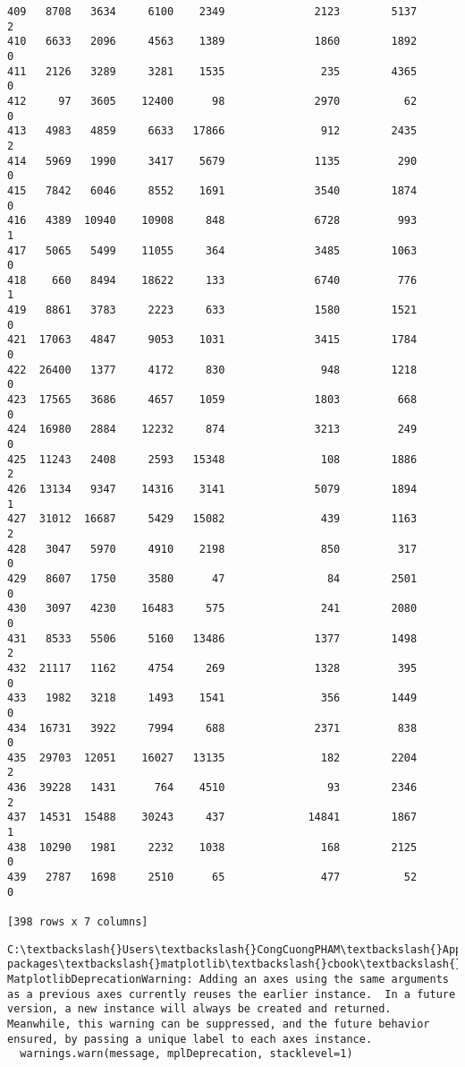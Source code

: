 \documentclass[11pt]{article}
\begin{document}
\begin{Verbatim}[commandchars=\\\{\}]
409   8708   3634     6100    2349              2123        5137      2
410   6633   2096     4563    1389              1860        1892      0
411   2126   3289     3281    1535               235        4365      0
412     97   3605    12400      98              2970          62      0
413   4983   4859     6633   17866               912        2435      2
414   5969   1990     3417    5679              1135         290      0
415   7842   6046     8552    1691              3540        1874      0
416   4389  10940    10908     848              6728         993      1
417   5065   5499    11055     364              3485        1063      0
418    660   8494    18622     133              6740         776      1
419   8861   3783     2223     633              1580        1521      0
421  17063   4847     9053    1031              3415        1784      0
422  26400   1377     4172     830               948        1218      0
423  17565   3686     4657    1059              1803         668      0
424  16980   2884    12232     874              3213         249      0
425  11243   2408     2593   15348               108        1886      2
426  13134   9347    14316    3141              5079        1894      1
427  31012  16687     5429   15082               439        1163      2
428   3047   5970     4910    2198               850         317      0
429   8607   1750     3580      47                84        2501      0
430   3097   4230    16483     575               241        2080      0
431   8533   5506     5160   13486              1377        1498      2
432  21117   1162     4754     269              1328         395      0
433   1982   3218     1493    1541               356        1449      0
434  16731   3922     7994     688              2371         838      0
435  29703  12051    16027   13135               182        2204      2
436  39228   1431      764    4510                93        2346      2
437  14531  15488    30243     437             14841        1867      1
438  10290   1981     2232    1038               168        2125      0
439   2787   1698     2510      65               477          52      0

[398 rows x 7 columns]

    \end{Verbatim}

    \begin{Verbatim}[commandchars=\\\{\}]
C:\textbackslash{}Users\textbackslash{}CongCuongPHAM\textbackslash{}AppData\textbackslash{}Local\textbackslash{}Continuum\textbackslash{}anaconda3\textbackslash{}lib\textbackslash{}site-packages\textbackslash{}matplotlib\textbackslash{}cbook\textbackslash{}deprecation.py:106: MatplotlibDeprecationWarning: Adding an axes using the same arguments as a previous axes currently reuses the earlier instance.  In a future version, a new instance will always be created and returned.  Meanwhile, this warning can be suppressed, and the future behavior ensured, by passing a unique label to each axes instance.
  warnings.warn(message, mplDeprecation, stacklevel=1)

    \end{Verbatim}
\end{document}
